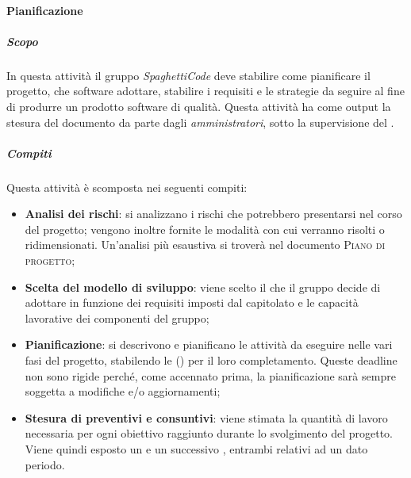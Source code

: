 \paragraph{Pianificazione}
\label{par:pianificazione}
\subparagraph{Scopo}
\label{par:pianificazione:scopo}
In questa attività il gruppo \emph{SpaghettiCode} deve stabilire come pianificare il progetto, che  software adottare, stabilire i requisiti e le strategie da seguire al fine di produrre un prodotto software di qualità. Questa attività ha come output la stesura del documento \textsc{} da parte dagli \emph{amministratori}, sotto la supervisione del
\emph{}.\\
\subparagraph{Compiti}
\label{par:pianificazione:compiti}
Questa attività è scomposta nei seguenti compiti:
\begin{itemize}
    \item \textbf{Analisi dei rischi}: si analizzano i rischi che potrebbero presentarsi nel corso del progetto; vengono inoltre fornite le modalità con cui verranno risolti o ridimensionati. Un'analisi più esaustiva si troverà nel documento \textsc{Piano di progetto};
    \item \textbf{Scelta del modello di sviluppo}: viene scelto il  che il gruppo decide di adottare in funzione dei requisiti imposti dal capitolato e le capacità lavorative dei componenti del gruppo;
    \item \textbf{Pianificazione}: si descrivono e pianificano le attività da eseguire nelle vari fasi del progetto, stabilendo le () per il loro completamento. Queste deadline non sono rigide perché, come accennato prima, la pianificazione sarà sempre soggetta a modifiche e/o aggiornamenti;
    \item \textbf{Stesura di preventivi e consuntivi}: viene stimata la quantità di lavoro necessaria per ogni obiettivo raggiunto durante lo svolgimento del progetto. Viene quindi esposto un  e un successivo , entrambi relativi ad un dato periodo.
\end{itemize}

